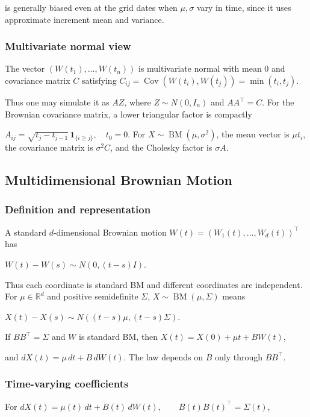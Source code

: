 is generally biased even at the grid dates when $\mu,\sigma$ vary in time, since it uses approximate increment mean and variance.

\subsubsection*{Multivariate normal view}

The vector $(W(t_1),\ldots,W(t_n))$ is multivariate normal with mean $0$ and covariance matrix $C$ satisfying
$C_{ij}=\operatorname{Cov}(W(t_i),W(t_j))=\min(t_i,t_j)$.

Thus one may simulate it as $AZ$, where $Z\sim N(0,I_n)$ and $AA^\top=C$. For the Brownian covariance matrix, a lower triangular factor is compactly

$A_{ij}=\sqrt{t_j-t_{j-1}}\,\mathbf{1}_{\{i\ge j\}},\quad t_0=0$.
For $X\sim\operatorname{BM}(\mu,\sigma^2)$, the mean vector is $\mu t_i$, the covariance matrix is $\sigma^2C$, and the Cholesky factor is $\sigma A$.

\subsection{Multidimensional Brownian Motion}

\subsubsection*{Definition and representation}

A standard $d$-dimensional Brownian motion $W(t)=(W_1(t),\ldots,W_d(t))^\top$ has

$W(t)-W(s)\sim N(0,(t-s)I)$.

Thus each coordinate is standard BM and different coordinates are independent. For $\mu\in\mathbb{R}^d$ and positive semidefinite $\Sigma$, $X\sim\operatorname{BM}(\mu,\Sigma)$ means

$X(t)-X(s)\sim N((t-s)\mu,(t-s)\Sigma)$.

If $BB^\top=\Sigma$ and $W$ is standard BM, then
$X(t)=X(0)+\mu t+BW(t)$,

and $dX(t)=\mu\,dt+B\,dW(t)$. The law depends on $B$ only through $BB^\top$.

\subsubsection*{Time-varying coefficients}

For
$dX(t)=\mu(t)\,dt+B(t)\,dW(t),\qquad B(t)B(t)^\top=\Sigma(t)$,

